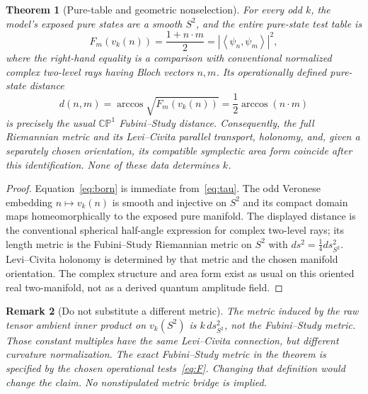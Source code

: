 \documentclass[10.5pt,letterpaper]{article}
\newtheorem{theorem}{Theorem}
\newtheorem{remark}[theorem]{Remark}
\begin{document}
\begin{theorem}[Pure-table and geometric nonselection]\label{thm:pure}
For every odd $k$, the model's exposed pure states are a smooth $S^2$, and the entire pure-state test table is
\begin{equation}\label{eq:born}
F_m(v_k(n))=\frac{1+n\cdot m}{2}
=\left|\left\langle\psi_n,\psi_m\right\rangle\right|^2,
\end{equation}
where the right-hand equality is a \emph{comparison} with conventional normalized complex two-level rays having Bloch vectors $n,m$. Its operationally defined pure-state distance
\[
d(n,m)=\arccos\sqrt{F_m(v_k(n))}=\frac12\arccos(n\cdot m)
\]
is precisely the usual $\mathbb{CP}^{1}$ Fubini--Study distance. Consequently, the full Riemannian metric and its Levi--Civita parallel transport, holonomy, and, given a separately chosen orientation, its compatible symplectic area form coincide after this identification. None of these data determines $k$.
\end{theorem}
\begin{proof}
Equation~\eqref{eq:born} is immediate from~\eqref{eq:tau}. The odd Veronese embedding $n\mapsto v_k(n)$ is smooth and injective on $S^2$ and its compact domain maps homeomorphically to the exposed pure manifold. The displayed distance is the conventional spherical half-angle expression for complex two-level rays; its length metric is the Fubini--Study Riemannian metric on $S^2$ with $ds^2=\tfrac14 ds^2_{S^2}$. Levi--Civita holonomy is determined by that metric and the chosen manifold orientation. The complex structure and area form exist as usual on this oriented real two-manifold, not as a derived quantum amplitude field.
\end{proof}
\begin{remark}[Do not substitute a different metric]
The metric \emph{induced by the raw tensor ambient inner product} on $v_k(S^2)$ is $k\,ds_{S^2}^2$, not the Fubini--Study metric. Those constant multiples have the same Levi--Civita connection, but different curvature normalization. The \emph{exact} Fubini--Study metric in the theorem is specified by the chosen operational tests~\eqref{eq:F}. Changing that definition would change the claim. No nonstipulated metric bridge is implied.
\end{remark}
\end{document}
